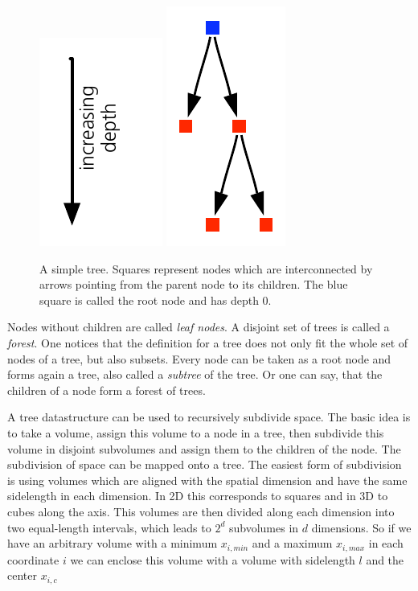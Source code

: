 \begin{figure}[htbp]
\begin{center}
\includegraphics[scale=1.0]{10tree_depth.pdf}
\includegraphics{08simpletree.pdf}
\caption{A simple tree. Squares represent nodes which are interconnected by arrows pointing from the parent node to its children. The blue square is called the root node and has depth $0$.}
\label{ch02_grav02_fig01}
\end{center}
\end{figure}

Nodes without children are called \emph{leaf nodes}. A disjoint set of trees is called a \emph{forest}. One notices that the definition for a tree does not only fit the whole set of nodes of a tree, but also subsets. Every node can be taken as a root node and forms again a tree, also called a \emph{subtree} of the tree. Or one can say, that the children of a node form a forest of trees.

A tree datastructure can be used to recursively subdivide space. The basic idea is to take a volume, assign this volume to a node in a tree, then subdivide this volume in disjoint subvolumes and assign them to the children of the node. The subdivision of space can be mapped onto a tree. The easiest form of subdivision is using volumes which are aligned with the spatial dimension and have the same sidelength in each dimension. In 2D this corresponds to squares and in 3D to cubes along the axis. This volumes are then divided along each dimension into two equal-length intervals, which leads to $2^d$ subvolumes in $d$ dimensions. So if we have an arbitrary volume with a minimum $x_{i,min}$ and a maximum $x_{i,max}$ in each coordinate $i$ we can enclose this volume with a volume with sidelength $l$ and the center $x_{i,c}$

